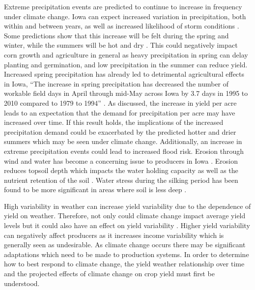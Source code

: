 Extreme precipitation events are predicted to continue to increase in frequency under climate change. Iowa can expect increased variation in precipitation, both within and  between years, as well as increased likelihood of storm conditions \citep{IowaSWCS}. 
Some predictions show that this increase will be felt during the spring and winter,  while the summers will be hot and dry \citep{Freese2009}. This could negatively impact corn growth and agriculture in general as heavy precipitation in spring can delay planting and germination, and low precipitation in the summer can reduce yield. Increased spring precipitation has already led to detrimental agricultural effects in Iowa, ``The increase in spring precipitation has decreased the number of workable field days in April through mid-May across Iowa by 3.7 days in 1995 to 2010 compared to 1979 to 1994” \citep{IowaSWCS}. As discussed, the increase in yield per acre leads to an expectation that the demand for precipitation per acre may have increased over time. If this result holds, the implications of the increased precipitation demand could be exacerbated by the predicted hotter and drier summers which may be seen under climate change. Additionally, an increase in extreme precipitation events could lead to increased flood risk. Erosion through wind and water has become a concerning issue to producers in Iowa  \citep{IowaSWCS}. Erosion reduces topsoil depth which impacts the water holding capacity as well as the nutrient retention of the soil \citep{lee2015topsoil}. Water stress during the silking period has been found to be more significant in areas where soil is less deep \citep{Guilpart}.

High variability in weather can increase yield variability due to the dependence of yield on weather. Therefore, not only could climate change impact average yield levels but it could also have an effect on yield variability \citep{cabas2010crop}. Higher yield variability can negatively affect producers as it increases income variability which is generally seen as undesirable. As climate change occurs there may be significant adaptations which need to be made to production systems. In order to determine how to best respond to climate change, the yield weather relationship over time and the projected effects of climate change on crop yield must first be understood.



